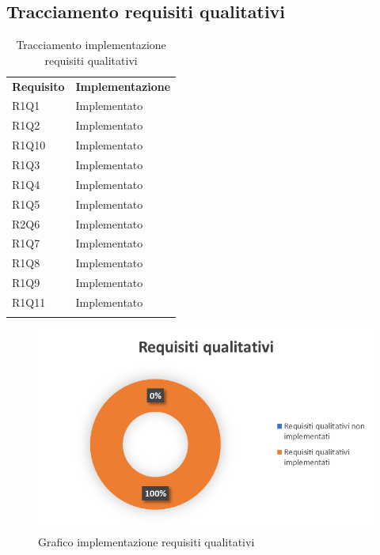     \subsection{Tracciamento requisiti qualitativi}
        \begin{longtable} {
            >{\centering}p{64.5mm} 
            >{}p{64.5mm}
            }
        \rowcolor{gray!50}
            \textbf{Requisito} & \textbf{Implementazione} \TBstrut \\
            R1Q1 & Implementato \TBstrut \\ [2mm]
            R1Q2 & Implementato \TBstrut \\ [2mm]
            R1Q10 & Implementato \TBstrut \\ [2mm]
            R1Q3 & Implementato \TBstrut \\ [2mm]
            R1Q4 & Implementato \TBstrut \\ [2mm]
            R1Q5 & Implementato \TBstrut \\ [2mm]
            R2Q6 & Implementato \TBstrut \\ [2mm]
            R1Q7 & Implementato \TBstrut \\ [2mm]
            R1Q8 & Implementato \TBstrut \\ [2mm]
            R1Q9 & Implementato \TBstrut \\ [2mm]
            R1Q11 & Implementato \TBstrut \\ [2mm]
            \rowcolor{white}
            \caption{Tracciamento implementazione requisiti qualitativi}
        \end{longtable}
        \begin{figure}[H]
            \includegraphics[width=\textwidth,height=\textheight,keepaspectratio]{./img/Grafici/qual.png}
            \caption{Grafico implementazione requisiti qualitativi}
        \end{figure}
       